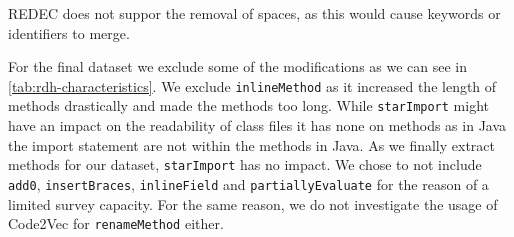 \documentclass[%
class=scrreprt,
chapterprefix=false,%
open=right,%
twoside=false,%
paper=a4,%
logofile={Logo\_zentral\_farbig\_EN.png},%
thesistype=master,%
UKenglish,%
]{se2thesis}
\theoremstyle{definition}
\newcommand{\rdh}{REDEC\xspace}
\begin{document}
	
	\rdh does not suppor the removal of spaces, as this would cause keywords or identifiers to merge.
	

	For the final dataset we exclude some of the modifications as we can see in \autoref{tab:rdh-characteristics}.
	We exclude \texttt{inlineMethod} as it increased the length of methods drastically and made the methods too long.
	While \texttt{starImport} might have an impact on the readability of class files it has none on methods as in Java the import statement are not within the methods in Java. As we finally extract methods for our dataset, \texttt{starImport} has no impact.
	We chose to not include \texttt{add0}, \texttt{insertBraces}, \texttt{inlineField} and \texttt{partiallyEvaluate} for the reason of a limited survey capacity.
	For the same reason, we do not investigate the usage of Code2Vec for \texttt{renameMethod} either.
\end{document}
